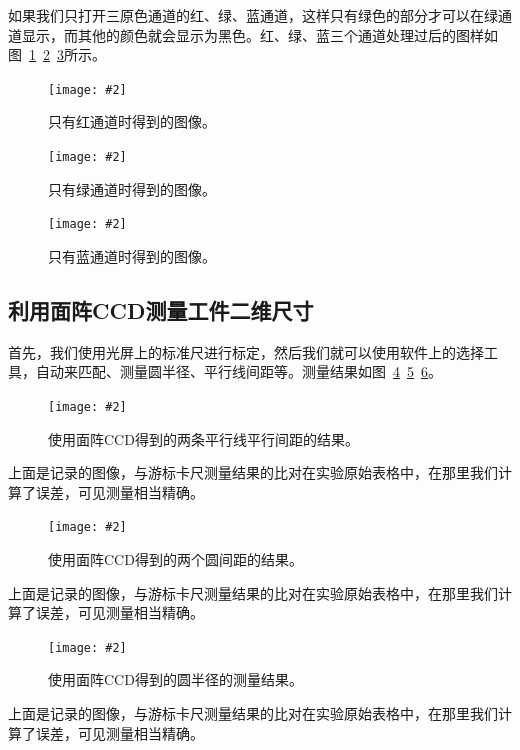 \documentclass{ctexart}
\newcommand{\cpic}[2]{
\begin{center}
\texttt{[image: \#2]}
\end{center}
}
\newcommand{\cpicn}[3]
{
\begin{figure}[H]
\cpic{#1}{#2}
\caption{#3\label{#2}}
\end{figure}
}
\begin{document}
如果我们只打开三原色通道的红、绿、蓝通道，这样只有绿色的部分才可以在绿通道显示，而其他的颜色就会显示为黑色。红、绿、蓝三个通道处理过后的图样如图~\ref{CCD/红通道}~\ref{CCD/绿通道}~\ref{CCD/蓝通道}所示。
\cpicn{0.5}{CCD/红通道}{只有红通道时得到的图像。}
\cpicn{0.5}{CCD/绿通道}{只有绿通道时得到的图像。}
\cpicn{0.5}{CCD/蓝通道}{只有蓝通道时得到的图像。}

\subsection{利用面阵CCD测量工件二维尺寸}
首先，我们使用光屏上的标准尺进行标定，然后我们就可以使用软件上的选择工具，自动来匹配、测量圆半径、平行线间距等。测量结果如图~\ref{CCD/平行间距}~\ref{CCD/圆间距}~\ref{CCD/圆半径}。
\cpicn{0.5}{CCD/平行间距}{使用面阵CCD得到的两条平行线平行间距的结果。}
上面是记录的图像，与游标卡尺测量结果的比对在实验原始表格中，在那里我们计算了误差，可见测量相当精确。
\cpicn{0.5}{CCD/圆间距}{使用面阵CCD得到的两个圆间距的结果。}
上面是记录的图像，与游标卡尺测量结果的比对在实验原始表格中，在那里我们计算了误差，可见测量相当精确。
\cpicn{0.5}{CCD/圆半径}{使用面阵CCD得到的圆半径的测量结果。}
上面是记录的图像，与游标卡尺测量结果的比对在实验原始表格中，在那里我们计算了误差，可见测量相当精确。
\end{document}
